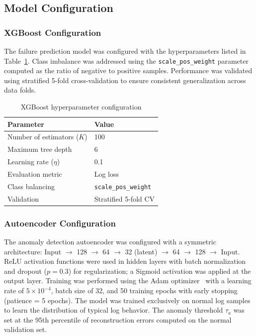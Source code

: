 \documentclass[a4paper,fleqn]{cas-dc}
\begin{document}
\subsection{Model Configuration}\label{subsec:modelconfig}

\subsubsection{XGBoost Configuration}
The failure prediction model was configured with the hyperparameters listed in Table~\ref{tab:xgbconfig}.
Class imbalance was addressed using the \texttt{scale\_pos\_weight} parameter computed as the ratio of negative to positive samples.
Performance was validated using stratified 5-fold cross-validation to ensure consistent generalization across data folds.

\begin{table}[htbp]
\caption{XGBoost hyperparameter configuration}\label{tab:xgbconfig}
\begin{tabular*}{\tblwidth}{@{\extracolsep{\fill}}ll@{}}
\toprule
\textbf{Parameter} & \textbf{Value} \\
\midrule
Number of estimators ($K$) & 100 \\
Maximum tree depth & 6 \\
Learning rate ($\eta$) & 0.1 \\
Evaluation metric & Log loss \\
Class balancing & \texttt{scale\_pos\_weight} \\
Validation & Stratified 5-fold CV \\
\bottomrule
\end{tabular*}
\end{table}

\subsubsection{Autoencoder Configuration}
The anomaly detection autoencoder was configured with a symmetric architecture: Input $\rightarrow$ 128 $\rightarrow$ 64 $\rightarrow$ 32 (latent) $\rightarrow$ 64 $\rightarrow$ 128 $\rightarrow$ Input.
ReLU activation functions were used in hidden layers with batch normalization and dropout ($p=0.3$) for regularization;
a Sigmoid activation was applied at the output layer. Training was performed using the Adam optimizer~\citep{kingma2015adam} with a learning rate of $5 \times 10^{-4}$, batch size of 32, and 50 training epochs with early stopping (patience = 5 epochs).
The model was trained exclusively on normal log samples to learn the distribution of typical log behavior.
The anomaly threshold $\tau_a$ was set at the 95th percentile of reconstruction errors computed on the normal validation set.
\end{document}
